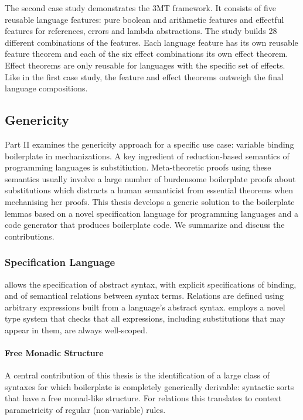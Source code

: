 The second case study demonstrates the 3MT framework. It consists of five
reusable language features: pure boolean and arithmetic features and effectful
features for references, errors and lambda abstractions. The study builds 28
different combinations of the features. Each language feature has its own
reusable feature theorem and each of the six effect combinations its own effect
theorem. Effect theorems are only reusable for languages with the specific set
of effects. Like in the first case study, the feature and effect theorems
outweigh the final language compositions.



\subsection{Genericity}
Part II examines the genericity approach for a specific use case: variable
binding boilerplate in mechanizations. A key ingredient of reduction-based
semantics of programming languages is substitiution. Meta-theoretic proofs using
these semantics usually involve a large number of burdensome boilerplate proofs
about substitutions which distracts a human semanticist from essential theorems
when mechanising her proofs. This thesis develops a generic solution to the
boilerplate lemmas based on a novel specification language \Knot for programming
languages and a code generator \Needle that produces boilerplate code. We
summarize and discuss the contributions.

\subsubsection{Specification Language}
\Knot allows the specification of abstract syntax, with explicit specifications
of binding, and of semantical relations between syntax terms. Relations are
defined using arbitrary expressions built from a language's abstract syntax.
\Knot employs a novel type system that checks that all expressions, including
substitutions that may appear in them, are always well-scoped.


\paragraph{Free Monadic Structure}
A central contribution of this thesis is the identification of a large class of
syntaxes for which boilerplate is completely generically derivable: syntactic
sorts that have a free monad-like structure. For relations this translates to
context parametricity of regular (non-variable) rules.


